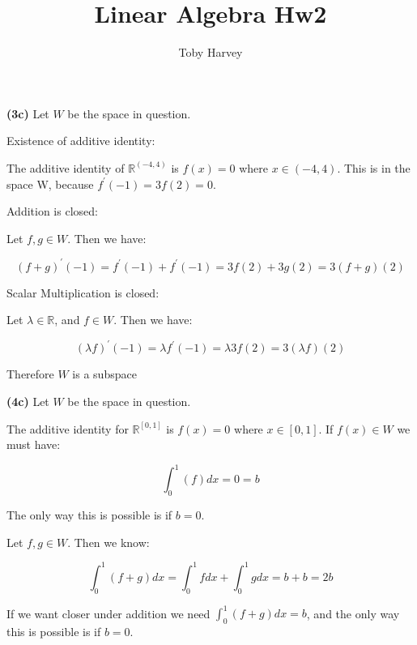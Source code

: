 \documentclass{article}
\begin{document}
\title{Linear Algebra Hw2}
\author{Toby Harvey}
\maketitle


\noindent \textbf{(3c)} Let $W$ be the space in question.

\vspace{3mm}
\noindent Existence of additive identity:


\noindent The additive identity of $\mathbb{R}^{(-4,4)}$ is $f(x) = 0$ where $x \in (-4,4)$. This is in the space W, because $f^{\prime}(-1) = 3f(2) = 0$.

\vspace{3mm}

\noindent Addition is closed:

\noindent Let $f,g \in W$. Then we have:

$$ (f + g)^{\prime}(-1) = f^{\prime}(-1) + f^{\prime}(-1) = 3f(2) + 3g(2) = 3(f+g)(2)$$

\vspace{3mm}

\noindent Scalar Multiplication is closed:

\noindent Let $\lambda \in \mathbb{R}$, and $f \in W$. Then we have:

$$(\lambda f)^{\prime}(-1) = \lambda f^{\prime}(-1) = \lambda 3f(2) = 3 (\lambda f)(2)$$


\noindent Therefore $W$ is a subspace


\vspace{9mm}


\noindent\textbf{(4c)} Let $W$ be the space in question.

\vspace{3mm}

\noindent The additive identity for $\mathbb{R}^{[0,1]}$ is $f(x) = 0$ where $x \in [0,1]$.
If $f(x) \in W$ we must have:

$$\int_0^1 (f) dx = 0 = b$$

\noindent The only way this is possible is if $b = 0$.

\vspace{3mm}

\noindent Let $f, g \in W$. Then we know:

$$\int_0^1 (f + g) dx = \int_0^1 f dx + \int_0^1 g dx = b + b = 2b$$

\noindent If we want closer under addition we need $\int_0^1 (f + g) dx = b$, and the only way this is possible is if $b=0$.
\end{document}
